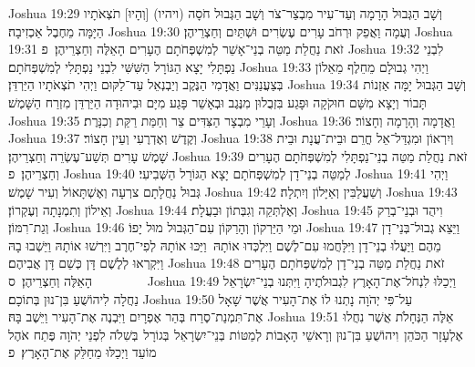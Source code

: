 Joshua 19:29	וְשָׁב הַגְּבוּל הָרָמָה וְעַד־עִיר מִבְצַר־צֹר וְשָׁב הַגְּבוּל חֹסָה (ויהיו) [וְהָיוּ] תֹצְאֹתָיו הַיָּמָּה מֵחֶבֶל אַכְזִיבָה׃
Joshua 19:30	וְעֻמָה וַאֲפֵק וּרְחֹב עָרִים עֶשְׂרִים וּשְׁתַּיִם וְחַצְרֵיהֶן׃
Joshua 19:31	זֹאת נַחֲלַת מַטֵּה בְנֵי־אָשֵׁר לְמִשְׁפְּחֹתָם הֶעָרִים הָאֵלֶּה וְחַצְרֵיהֶן׃ {פ}
Joshua 19:32	לִבְנֵי נַפְתָּלִי יָצָא הַגּוֹרָל הַשִּׁשִּׁי לִבְנֵי נַפְתָּלִי לְמִשְׁפְּחֹתָם׃
Joshua 19:33	וַיְהִי גְבוּלָם מֵחֵלֶף מֵאֵלוֹן בְּצַעֲנַנִּים וַאֲדָמִי הַנֶּקֶב וְיַבְנְאֵל עַד־לַקּוּם וַיְהִי תֹצְאֹתָיו הַיַּרְדֵּן׃
Joshua 19:34	וְשָׁב הַגְּבוּל יָמָּה אַזְנוֹת תָּבוֹר וְיָצָא מִשָּׁם חוּקֹקָה וּפָגַע בִּזְבֻלוּן מִנֶּגֶב וּבְאָשֵׁר פָּגַע מִיָּם וּבִיהוּדָה הַיַּרְדֵּן מִזְרַח הַשָּׁמֶשׁ׃
Joshua 19:35	וְעָרֵי מִבְצָר הַצִּדִּים צֵר וְחַמַּת רַקַּת וְכִנָּרֶת׃
Joshua 19:36	וַאֲדָמָה וְהָרָמָה וְחָצוֹר׃
Joshua 19:37	וְקֶדֶשׁ וְאֶדְרֶעִי וְעֵין חָצוֹר׃
Joshua 19:38	וְיִרְאוֹן וּמִגְדַּל־אֵל חֳרֵם וּבֵית־עֲנָת וּבֵית שָׁמֶשׁ עָרִים תְּשַׁע־עֶשְׂרֵה וְחַצְרֵיהֶן׃
Joshua 19:39	זֹאת נַחֲלַת מַטֵּה בְנֵי־נַפְתָּלִי לְמִשְׁפְּחֹתָם הֶעָרִים וְחַצְרֵיהֶן׃ {פ}
Joshua 19:40	לְמַטֵּה בְנֵי־דָן לְמִשְׁפְּחֹתָם יָצָא הַגּוֹרָל הַשְּׁבִיעִי׃
Joshua 19:41	וַיְהִי גְּבוּל נַחֲלָתָם צרְעָה וְאֶשְׁתָּאוֹל וְעִיר שָׁמֶשׁ׃
Joshua 19:42	וְשַׁעֲלַבִּין וְאַיָּלוֹן וְיִתְלָה׃
Joshua 19:43	וְאֵילוֹן וְתִמְנָתָה וְעֶקְרוֹן׃
Joshua 19:44	וְאֶלְתְּקֵה וְגִבְּתוֹן וּבַעֲלָת׃
Joshua 19:45	וִיהֻד וּבְנֵי־בְרַק וְגַת־רִמּוֹן׃
Joshua 19:46	וּמֵי הַיַּרְקוֹן וְהָרַקּוֹן עִם־הַגְּבוּל מוּל יָפוֹ׃
Joshua 19:47	וַיֵּצֵא גְבוּל־בְּנֵי־דָן מֵהֶם וַיַּעֲלוּ בְנֵי־דָן וַיִּלָּחֲמוּ עִם־לֶשֶׁם וַיִּלְכְּדוּ אוֹתָהּ  וַיַּכּוּ אוֹתָהּ לְפִי־חֶרֶב וַיִּרְשׁוּ אוֹתָהּ וַיֵּשְׁבוּ בָהּ וַיִּקְרְאוּ לְלֶשֶׁם דָּן כְּשֵׁם דָּן אֲבִיהֶם׃
Joshua 19:48	זֹאת נַחֲלַת מַטֵּה בְנֵי־דָן לְמִשְׁפְּחֹתָם הֶעָרִים הָאֵלֶּה וְחַצְרֵיהֶן׃ {ס}        
Joshua 19:49	וַיְכַלּוּ לִנְחֹל־אֶת־הָאָרֶץ לִגְבוּלֹתֶיהָ וַיִּתְּנוּ בְנֵי־יִשְׂרָאֵל נַחֲלָה לִיהוֹשֻׁעַ בִּן־נוּן בְּתוֹכָם׃
Joshua 19:50	עַל־פִּי יְהֹוָה נָתְנוּ לוֹ אֶת־הָעִיר אֲשֶׁר שָׁאָל אֶת־תִּמְנַת־סֶרַח בְּהַר אֶפְרָיִם וַיִּבְנֶה אֶת־הָעִיר וַיֵּשֶׁב בָּהּ׃
Joshua 19:51	אֵלֶּה הַנְּחָלֹת אֲשֶׁר נִחֲלוּ אֶלְעָזָר הַכֹּהֵן  וִיהוֹשֻׁעַ בִּן־נוּן וְרָאשֵׁי הָאָבוֹת לְמַטּוֹת בְּנֵי־יִשְׂרָאֵל  בְּגוֹרָל  בְּשִׁלֹה לִפְנֵי יְהֹוָה פֶּתַח אֹהֶל מוֹעֵד וַיְכַלּוּ מֵחַלֵּק אֶת־הָאָרֶץ׃ {פ}

